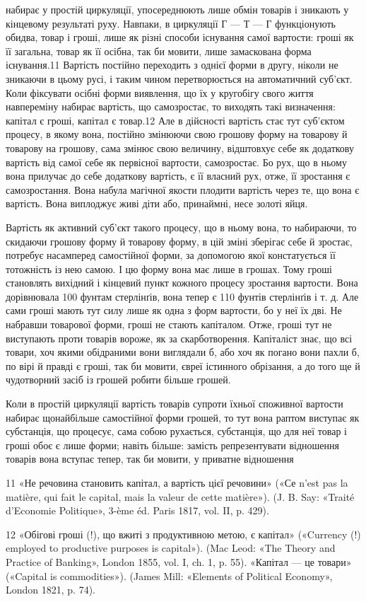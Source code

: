 набирає у простій циркуляції, упосереднюють лише обмін товарів
і зникають у кінцевому результаті руху. Навпаки, в циркуляції
Г — Т — Г функціонують обидва, товар і гроші, лише як різні
способи існування самої вартости: гроші як її загальна, товар
як її осібна, так би мовити, лише замаскована форма існування.11
Вартість постійно переходить з однієї форми в другу, ніколи не
зникаючи в цьому русі, і таким чином перетворюється на автоматичний
суб’єкт. Коли фіксувати осібні форми виявлення, що
їх у кругобігу свого життя навпереміну набирає вартість, що
самозростає, то виходять такі визначення: капітал є гроші, капітал
є товар.12 Але в дійсності вартість стає тут суб’єктом процесу,
в якому вона, постійно змінюючи свою грошову форму на товарову
й товарову на грошову, сама змінює свою величину, відштовхує
себе як додаткову вартість від самої себе як первісної
вартости, самозростає. Бо рух, що в ньому вона прилучає до себе
додаткову вартість, є її власний рух, отже, її зростання є самозростання.
Вона набула магічної якости плодити вартість через
те, що вона є вартість. Вона виплоджує живі діти або, принаймні,
несе золоті яйця.

Вартість як активний суб’єкт такого процесу, що в ньому
вона, то набираючи, то скидаючи грошову форму й товарову
форму, в цій зміні зберігає себе й зростає, потребує насамперед
самостійної форми, за допомогою якої констатується її тотожність
із нею самою. І цю форму вона має лише в грошах. Тому гроші
становлять вихідний і кінцевий пункт кожного процесу зростання
вартости. Вона дорівнювала 100 фунтам стерлінґів, вона тепер
є 110 фунтів стерлінґів і т. д. Але сами гроші мають тут силу
лише як одна з форм вартости, бо у неї їх дві. Не набравши товарової
форми, гроші не стають капіталом. Отже, гроші тут не виступають
проти товарів вороже, як за скарботворення. Капіталіст
знає, що всі товари, хоч якими обідраними вони виглядали б,
або хоч як погано вони пахли б, по вірі й правді є гроші, так би
мовити, євреї істинного обрізання, а до того ще й чудотворний
засіб із грошей робити більше грошей.

Коли в простій циркуляції вартість товарів супроти їхньої
споживної вартости набирає щонайбільше самостійної форми
грошей, то тут вона раптом виступає як субстанція, що процесує,
сама собою рухається, субстанція, що для неї товар і гроші обоє
є лише форми; навіть більше: замість репрезентувати відношення
товарів вона вступає тепер, так би мовити, у приватне відношення

11 «Не речовина становить капітал, а вартість цієї речовини» («Се
n’est pas la matière, qui fait le capital, mais la valeur de cette matière»).
(J. B. Say: «Traité d’Economie Politique», 3-ème éd. Paris 1817, vol. II,
p. 429).

12 «Обігові гроші (!), що вжиті з продуктивною метою, є капітал»
(«Currency (!) employed to productive purposes is capital»). (Mac Leod:
«The Theory and Practice of Banking», London 1855, vol. I, ch. 1, p. 55).
«Капітал — це товари» («Capital is commodities»). (James Mill: «Elements
of Political Economy», London 1821, p. 74).
